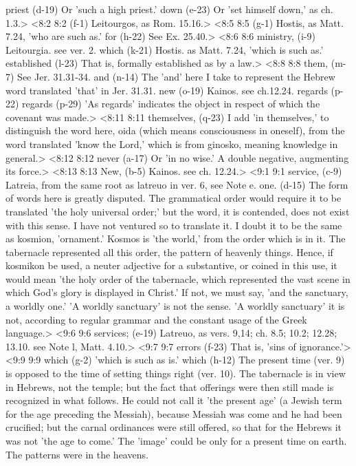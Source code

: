   priest (d-19)  Or 'such a high priest.'
  down (e-23)  Or 'set himself down,' as ch. 1.3.>
<8:2 8:2   (f-1)  Leitourgos, as Rom. 15.16.>
<8:5 8:5   (g-1)  Hostis, as Matt. 7.24, 'who are such as.'
  for (h-22)  See Ex. 25.40.>
<8:6 8:6  ministry, (i-9)  Leitourgia. see ver. 2.
  which (k-21)  Hostis. as Matt. 7.24, 'which is such as.'
  established (l-23)  That is, formally established as by a law.>
<8:8 8:8  them, (m-7)  See Jer. 31.31-34.
  and (n-14)  The 'and' here I take to represent the Hebrew word translated  'that' in Jer. 31.31.
  new (o-19)  Kainos. see ch.12.24.
  regards (p-22)  regards (p-29)
  'As regards' indicates the object in respect of which the  covenant was made.>
<8:11 8:11  themselves, (q-23)  I add 'in themselves,' to distinguish the word here, oida  (which means consciousness in oneself), from the word  translated 'know the Lord,' which is from ginosko, meaning  knowledge in general.>
<8:12 8:12  never (a-17)  Or 'in no wise.' A double negative, augmenting its force.>
<8:13 8:13  New, (b-5)  Kainos. see ch. 12.24.>
<9:1 9:1  service, (c-9)  Latreia, from the same root as latreuo in ver. 6, see  Note e.
  one. (d-15)  The form of words here is greatly disputed. The grammatical  order would require it to be translated 'the holy universal  order;' but the word, it is contended, does not exist with this  sense. I have not ventured so to translate it. I doubt it to be  the same as kosmion, 'ornament.' Kosmos is 'the world,'  from the order which is in it. The tabernacle represented all  this order, the pattern of heavenly things. Hence, if  kosmikon be used, a neuter adjective for a substantive, or  coined in this use, it would mean 'the holy order of the  tabernacle, which represented the vast scene in which God's  glory is displayed in Christ.' If not, we must say, 'and the  sanctuary, a worldly one.' 'A worldly sanctuary' is not the  sense. 'A worldly sanctuary' it is not, according to regular  grammar and the constant usage of the Greek language.>
<9:6 9:6  services; (e-19)  Latreuo, as vers. 9,14; ch. 8.5; 10.2; 12.28; 13.10. see  Note l, Matt. 4.10.>
<9:7 9:7  errors (f-23)  That is, 'sins of ignorance.'>
<9:9 9:9  which (g-2)  'which is such as is.'
  which (h-12)  The present time (ver. 9) is opposed to the time of setting  things right (ver. 10). The tabernacle is in view in Hebrews,  not the temple; but the fact that offerings were then still  made is recognized in what follows. He could not call it 'the  present age' (a Jewish term for the age preceding the Messiah),  because Messiah was come and he had been crucified; but the  carnal ordinances were still offered, so that for the Hebrews  it was not 'the age to come.' The 'image' could be only for a  present time on earth. The patterns were in the heavens.
